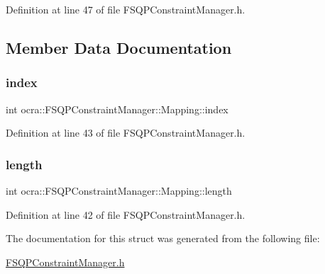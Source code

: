 Definition at line 47 of file F\+S\+Q\+P\+Constraint\+Manager.\+h.



\subsection{Member Data Documentation}
\hypertarget{structocra_1_1FSQPConstraintManager_1_1Mapping_a10fd8eae295eb4d5f9dc4258b065275b}{}\label{structocra_1_1FSQPConstraintManager_1_1Mapping_a10fd8eae295eb4d5f9dc4258b065275b} 
\subsubsection{\texorpdfstring{index}{index}}
{\footnotesize\ttfamily int ocra\+::\+F\+S\+Q\+P\+Constraint\+Manager\+::\+Mapping\+::index}



Definition at line 43 of file F\+S\+Q\+P\+Constraint\+Manager.\+h.

\hypertarget{structocra_1_1FSQPConstraintManager_1_1Mapping_a223da0da4c89d6cbc8d025a867943194}{}\label{structocra_1_1FSQPConstraintManager_1_1Mapping_a223da0da4c89d6cbc8d025a867943194} 
\subsubsection{\texorpdfstring{length}{length}}
{\footnotesize\ttfamily int ocra\+::\+F\+S\+Q\+P\+Constraint\+Manager\+::\+Mapping\+::length}



Definition at line 42 of file F\+S\+Q\+P\+Constraint\+Manager.\+h.



The documentation for this struct was generated from the following file\+:\begin{DoxyCompactItemize}
\item 
\hyperlink{FSQPConstraintManager_8h}{F\+S\+Q\+P\+Constraint\+Manager.\+h}\end{DoxyCompactItemize}
